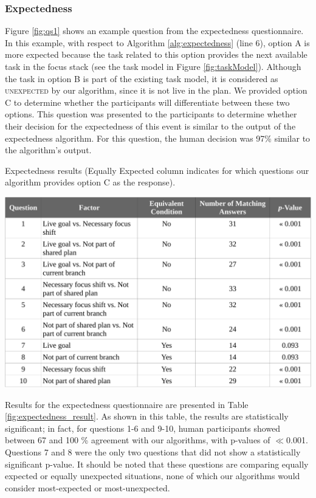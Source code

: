 \documentclass[12pt]{report}
\begin{document}
\subsubsection{Expectedness}
\label{sec:expectedness-crowdsourcing}
Figure \ref{fig:qs1} shows an example question from the expectedness
questionnaire. In this example, with respect to Algorithm \ref{alg:expectedness}
(line 6), option A is more expected because the task related to this option
provides the next available task in the focus stack (see the task model in
Figure \ref{fig:taskModel}). Although the task in option B is part of the
existing task model, it is considered as \textsc{unexpected} by our algorithm,
since it is not live in the plan. We provided option C to determine whether the
participants will differentiate between these two options. This question was
presented to the participants to determine whether their decision for the
expectedness of this event is similar to the output of the expectedness
algorithm. For this question, the human decision was 97\% similar to the
algorithm's output.

\vspace*{3mm}
\begin{table}[tbh]
  \centering
  \caption{Expectedness results {\color{red}(Equally Expected column indicates
  for which questions our algorithm provides option C as the response)}.}
  \label{fig:expectedness_result}
  \vspace*{-3mm}
  \includegraphics[width=1\textwidth]{figure/expectedness_result_croped.pdf}
\end{table}

Results for the expectedness questionnaire are presented in Table
\ref{fig:expectedness_result}. As shown in this table, the results are
statistically significant; in fact, for questions 1-6 and 9-10, human
participants showed between 67 and 100 \% agreement with our algorithms, with
p-values of $\ll$0.001. Questions 7 and 8 were the only two questions that did
not show a statistically significant p-value. It should be noted that these
questions are comparing equally expected or equally unexpected situations, none
of which our algorithms would consider most-expected or most-unexpected.
\end{document}
